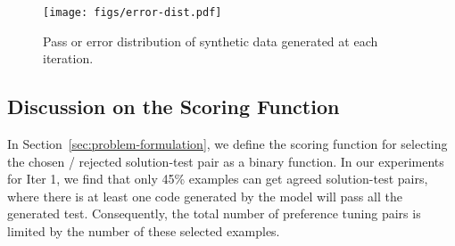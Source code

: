 \begin{figure}
    \centering
    \texttt{[image: figs/error-dist.pdf]}
    \caption{Pass or error distribution of synthetic data generated at each iteration.}
    \label{fig:error-dist}
\end{figure}


\begin{table}[h]
\caption{Code generation performance for different settings of the scoring function for selecting DPO pairs. Results indicate better results are obtained with less, but higher quality, data ($\epsilon>0$).}
\begin{center}
\end{center}
\label{tab:scoring-func}
\end{table}

\subsection{Discussion on the Scoring Function}
In Section~\ref{sec:problem-formulation}, we define the scoring function for selecting the chosen / rejected solution-test pair as a binary function.
In our experiments for Iter 1, we find that only 45\% examples can get agreed solution-test pairs, where there is at least one code generated by the model will pass all the generated test. Consequently, the total number of preference tuning pairs is limited by the number of these selected examples.

